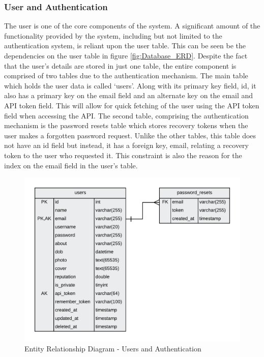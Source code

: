 \subsubsection{User and Authentication}
The user is one of the core components of the system. A significant amount of the functionality provided by the system, including but not limited to the authentication system, is reliant upon the user table. This can be seen be the dependencies on the user table in figure \ref{fig:Database_ERD}. Despite the fact that the user's details are stored in just one table, the entire component is comprised of two tables due to the authentication mechanism. The main table which holds the user data is called `users'. Along with its primary key field, id, it also has a primary key on the email field and an alternate key on the email and API token field. This will allow for quick fetching of the user using the API token field when accessing the API. The second table, comprising the authentication mechanism is the password resets table which stores recovery tokens when the user makes a forgotten password request. Unlike the other tables, this table does not have an id field but instead, it has a foreign key, email, relating a recovery token to the user who requested it. This constraint is also the reason for the index on the email field in the user's table.

\begin{figure}[H]
  \centering
  \includegraphics[width=1.0\textwidth]{Images/Design/Database/Users}
  \caption{Entity Relationship Diagram - Users and Authentication} \label{fig:ERD_Users}
\end{figure}

